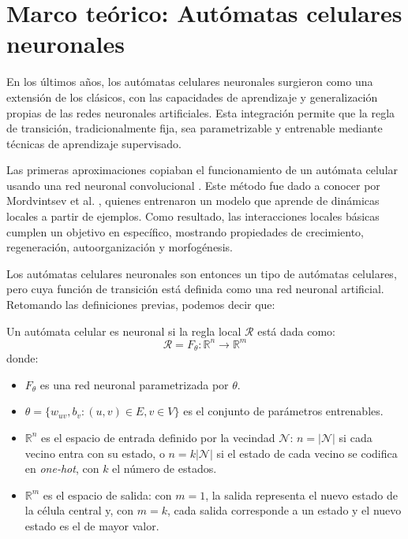 \chapter{Marco teórico: Autómatas celulares neuronales}

En los últimos años, los autómatas celulares neuronales surgieron como una extensión de los clásicos, con las capacidades de aprendizaje y generalización propias de las redes neuronales artificiales. Esta integración permite que la regla de transición, tradicionalmente fija, sea parametrizable y entrenable mediante técnicas de aprendizaje supervisado.

Las primeras aproximaciones copiaban el funcionamiento de un autómata celular usando una red neuronal convolucional \cite{gilpin2019_nca}. Este método fue dado a conocer por Mordvintsev et al. \cite{mordvintsev2020_nca}, quienes entrenaron un modelo que aprende de dinámicas locales a partir de ejemplos. Como resultado, las interacciones locales básicas cumplen un objetivo en específico, mostrando propiedades de crecimiento, regeneración, autoorganización y morfogénesis.

Los autómatas celulares neuronales son entonces un tipo de autómatas celulares, pero cuya función de transición está definida como una red neuronal artificial. Retomando las definiciones previas, podemos decir que:

\begin{definition}
	
	Un autómata celular es neuronal si la regla local $\mathcal{R}$ está dada como:
	\[
	\mathcal{R} = F_\theta: \mathbb{R}^{n} \to \mathbb{R}^{m}
	\]
	donde:

	\begin{itemize}

		\item $F_\theta$ es una red neuronal parametrizada por $\theta$.

		\item $ \theta = \{ w_{uv}, b_v : (u, v) \in E, v \in V \}$ es el conjunto de parámetros entrenables.

		\item $\mathbb{R}^{n}$ es el espacio de entrada definido por la vecindad $\mathcal{N}$: $n = |\mathcal{N}|$ si cada vecino entra con su estado, o $n = k|\mathcal{N}|$ si el estado de cada vecino se codifica en \textit{one-hot}, con $k$ el número de estados.

		\item $\mathbb{R}^{m}$ es el espacio de salida: con $m = 1$, la salida representa el nuevo estado de la célula central y, con $m = k$, cada salida corresponde a un estado y el nuevo estado es el de mayor valor.
		
	\end{itemize}
	
\end{definition}


